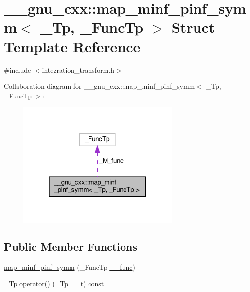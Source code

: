 \hypertarget{struct____gnu__cxx_1_1map__minf__pinf__symm}{}\section{\+\_\+\+\_\+gnu\+\_\+cxx\+:\+:map\+\_\+minf\+\_\+pinf\+\_\+symm$<$ \+\_\+\+Tp, \+\_\+\+Func\+Tp $>$ Struct Template Reference}
\label{struct____gnu__cxx_1_1map__minf__pinf__symm}


{\ttfamily \#include $<$integration\+\_\+transform.\+h$>$}



Collaboration diagram for \+\_\+\+\_\+gnu\+\_\+cxx\+:\+:map\+\_\+minf\+\_\+pinf\+\_\+symm$<$ \+\_\+\+Tp, \+\_\+\+Func\+Tp $>$\+:
\nopagebreak
\begin{figure}[H]
\begin{center}
\leavevmode
\includegraphics[width=229pt]{struct____gnu__cxx_1_1map__minf__pinf__symm__coll__graph}
\end{center}
\end{figure}
\subsection*{Public Member Functions}
\begin{DoxyCompactItemize}
\item 
\hyperlink{struct____gnu__cxx_1_1map__minf__pinf__symm_a31f5258be5cf1e1e9fc7b2157fe73461}{map\+\_\+minf\+\_\+pinf\+\_\+symm} (\+\_\+\+Func\+Tp \hyperlink{namespace____gnu__cxx_af2b2f0c7a2ae72b922b1afefae5a65b2}{\+\_\+\+\_\+func})
\item 
\hyperlink{namespace____gnu__cxx_a3b19a9c800ca194374ef9172290f7d79}{\+\_\+\+Tp} \hyperlink{struct____gnu__cxx_1_1map__minf__pinf__symm_a9814773879a6ccd8379237161697dfe8}{operator()} (\hyperlink{namespace____gnu__cxx_a3b19a9c800ca194374ef9172290f7d79}{\+\_\+\+Tp} \+\_\+\+\_\+t) const
\end{DoxyCompactItemize}
